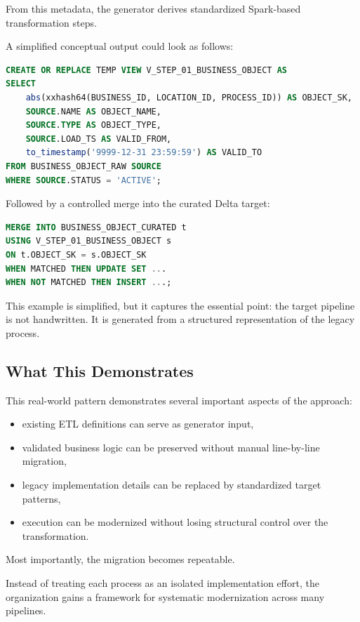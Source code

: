 \documentclass[11pt,a4paper]{article}
\begin{document}
From this metadata, the generator derives standardized Spark-based transformation steps.

A simplified conceptual output could look as follows:

\begin{lstlisting}[style=hfcode,language=SQL,caption={Conceptual generated Spark SQL output.}]
CREATE OR REPLACE TEMP VIEW V_STEP_01_BUSINESS_OBJECT AS
SELECT
    abs(xxhash64(BUSINESS_ID, LOCATION_ID, PROCESS_ID)) AS OBJECT_SK,
    SOURCE.NAME AS OBJECT_NAME,
    SOURCE.TYPE AS OBJECT_TYPE,
    SOURCE.LOAD_TS AS VALID_FROM,
    to_timestamp('9999-12-31 23:59:59') AS VALID_TO
FROM BUSINESS_OBJECT_RAW SOURCE
WHERE SOURCE.STATUS = 'ACTIVE';
\end{lstlisting}

Followed by a controlled merge into the curated Delta target:

\begin{lstlisting}[style=hfcode,language=SQL,caption={Conceptual generated Delta merge output.}]
MERGE INTO BUSINESS_OBJECT_CURATED t
USING V_STEP_01_BUSINESS_OBJECT s
ON t.OBJECT_SK = s.OBJECT_SK
WHEN MATCHED THEN UPDATE SET ...
WHEN NOT MATCHED THEN INSERT ...;
\end{lstlisting}

This example is simplified, but it captures the essential point: the target pipeline is not handwritten. It is generated from a structured representation of the legacy process.

\subsection{What This Demonstrates}

This real-world pattern demonstrates several important aspects of the approach:
\begin{itemize}
  \item existing ETL definitions can serve as generator input,
  \item validated business logic can be preserved without manual line-by-line migration,
  \item legacy implementation details can be replaced by standardized target patterns,
  \item execution can be modernized without losing structural control over the transformation.
\end{itemize}

Most importantly, the migration becomes repeatable.

Instead of treating each process as an isolated implementation effort, the organization gains a framework for systematic modernization across many pipelines.
\end{document}

